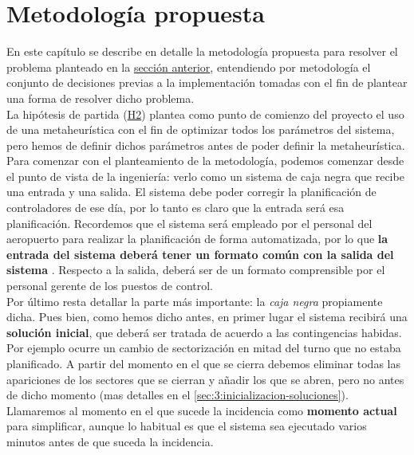 \graphicspath{{capitulos/Capitulo3-Metodologia-propuesta/recursos/}}

\section{Metodología propuesta} \label{apartado:3}
En este capítulo se describe en detalle la metodología propuesta para resolver el problema planteado en la \hyperref[apartado:2]{sección anterior}, entendiendo por metodología el conjunto de decisiones previas a la implementación tomadas con el fin de plantear una forma de resolver dicho problema.
\\

La hipótesis de partida (\hyperref[H2]{H2}) plantea como punto de comienzo del proyecto el uso de una metaheurística 
con el fin de optimizar todos los parámetros del sistema, pero hemos de definir dichos parámetros antes de poder 
definir la metaheurística.
\\

Para comenzar con el planteamiento de la metodología, podemos comenzar desde el punto de vista de la ingeniería: verlo como un sistema de caja negra que recibe una entrada y una salida.
El sistema debe poder corregir la planificación de controladores de ese día, por lo tanto es claro que la entrada será esa planificación. Recordemos que el sistema \legacy{} será empleado por el personal del aeropuerto para realizar la planificación de forma automatizada, por lo que \textbf{la entrada del sistema deberá tener un formato común con la salida del sistema \legacy{}}.
Respecto a la salida, deberá ser de un formato comprensible por el personal gerente de los puestos de control.
\\

Por último resta detallar la parte más importante: la \textit{caja negra} propiamente dicha. Pues bien, como hemos 
dicho antes, en primer lugar el sistema recibirá una \textbf{solución inicial}, que deberá ser tratada de acuerdo a las 
contingencias habidas. Por ejemplo ocurre un cambio de sectorización en mitad del turno que no estaba planificado. A 
partir del momento en el que se cierra debemos eliminar todas las apariciones de los sectores que se cierran y añadir 
los que se abren, pero no antes de dicho momento (mas detalles en el \autoref{sec:3:inicializacion-soluciones}). 
Llamaremos al momento en el que sucede la incidencia como \textbf{momento actual} para simplificar, aunque lo habitual 
es que el sistema sea ejecutado varios minutos antes de que suceda la incidencia.

